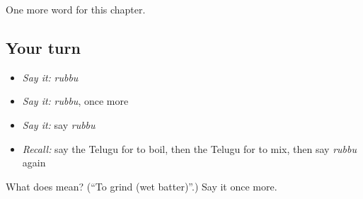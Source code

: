 \begin{grammarlens}[title={What you've built}]
One more word for this chapter.
\end{grammarlens}

\subsection*{Your turn}
\begin{itemize}
\raggedright
  \item \emph{Say it:} \emph{rubbu}
  \item \emph{Say it:} \emph{rubbu}, once more
  \item \emph{Say it:} say \emph{rubbu}
  \item \emph{Recall:} say the Telugu for to boil, then the Telugu for to mix, then say \emph{rubbu} again
\end{itemize}

\begin{tcolorbox}[breakable,colback=teal!4,colframe=teal!35!black,title={Before you move on}]
What does  mean? (\textquotedblleft{}To grind (wet batter)\textquotedblright{}.) Say it once more.
\end{tcolorbox}
